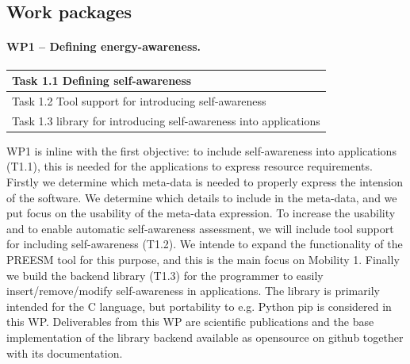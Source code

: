 \documentclass{article}
\begin{document}
\subsection{Work packages}
\paragraph{WP1 -- Defining energy-awareness.}
\begin{table}
\vspace{-0.5cm}
\small
\begin{tabular}{ | l |}
\hline
{Task 1.1 Defining self-awareness}  \\ \hline
{Task 1.2 Tool support for introducing self-awareness}  \\ \hline
{Task 1.3 library for introducing self-awareness into applications}\\ \hline
\end{tabular}
\vspace{-0.3cm}
\end{table}
WP1 is inline with the first objective: to include self-awareness into applications (T1.1), this is needed for the applications to express resource requirements.
Firstly we determine which meta-data is needed to properly express the intension of the software.
We determine which details to include in the meta-data, and we put focus on the usability of the meta-data expression.
To increase the usability and to enable automatic self-awareness assessment, we will include tool support for including self-awareness (T1.2).
We intende to expand the functionality of the PREESM tool for this purpose, and this is the main focus on Mobility 1.
Finally we build the backend library (T1.3) for the programmer to easily insert/remove/modify self-awareness in applications.
The library is primarily intended for the C language, but portability to e.g. Python pip is considered in this WP.
Deliverables from this WP are scientific publications and the base implementation of the library backend available as opensource on github together with its documentation.
\end{document}
